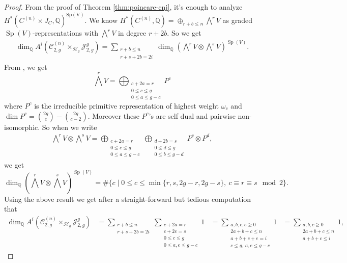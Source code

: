 \documentclass[11pt]{amsart}
\theoremstyle{definition}
\newcommand{\jac}{\mathcal{J}}
\newcommand{\h}{\mathcal{H}}
\newcommand{\mC}{\mathcal{C}}
\begin{document}
\begin{proof}
From the proof of Theorem \ref{thm:poincare-cnj}, it's enough to analyze $H^* (C^{(n)}\times J_C,\mathbb Q)^{\operatorname{Sp(V)}}$. We know $H^* (C^{(n)},\mathbb Q) = \oplus_{r+b \leq n}\bigwedge ^r V$ as graded $\operatorname{Sp}(V)$-representations with $\bigwedge^r V$ in degree $r+2b$. So we get\begin{equation*}
    \begin{aligned}
        \dim_{\mathbb Q} A^i(\mC_{2,g}^{(n)}\times_{\h_g}\jac^g_{2,g}) =\sum_{\substack{r+b\leq n \\ r+s+2b=2i}} \dim_{\mathbb Q} \left (\bigwedge^r V\otimes \bigwedge^{s} V \right )^{\operatorname{Sp}(V)}.
    \end{aligned}
\end{equation*}From \cite[Theorem 5.5.15, Corollary 5.5.16]{MR2522486}, we get \begin{equation*}
    \bigwedge^r V = \bigoplus_{\substack{ c+2a=r \\ 0\leq c\leq g \\ 0\leq a\leq g-c}} P^c
\end{equation*}where $P^c$ is the irreducible primitive representation of highest weight $\omega_c$ and $\dim P^c = \binom{2g}{c} -\binom{2g}{c-2}$. Moreover these $P^c$'s are self dual and pairwise non-isomorphic. So when we write \begin{equation*}
    \begin{aligned}
         \bigwedge^r V  \otimes  \bigwedge^{s} V =   \bigoplus_{\substack{ c+2a=r \\ 0\leq c\leq g \\ 0\leq a\leq g-c}} \bigoplus_{\substack{d+2b=s \\ 0\leq d\leq g \\ 0\leq b\leq g-d}} P^c \otimes P^{d},
    \end{aligned}
\end{equation*}we get \begin{equation*}
    \dim_{\mathbb Q} \left (\bigwedge^r V  \otimes  \bigwedge^{s} V \right ) ^{\operatorname{Sp}(V)} = \# \{c \mid  0\leq c\leq \min\{ r,s,2g-r,2g-s \}, \ c\equiv r\equiv s \mod 2\}.
\end{equation*}
Using the above result we get after a straight-forward but tedious computation that \begin{equation*}
    \begin{aligned}
 \dim_{\mathbb Q} A^i(\mC_{2,g}^{(n)}\times_{\h_g}\jac^g_{2,g})  & = \sum_{\substack{r+b \leq n \\ r+s+2b=2i} } \sum_{\substack{c+2a=r \\ c+2e=s \\ 0 \leq c\leq g\\ 0\leq a,e\leq g-c}} 1 &= \sum_{\substack{a,b,c,e\geq 0 \\ 2a+b+c\leq n \\ a+b+c+e=i \\ c\leq g,  \ a,e \leq g-c}}1 &= \sum_{\substack{a,b,c\geq 0 \\ 2a+b+c\leq n \\ a+b+c\leq i }}1   ,

\end{aligned}
\end{equation*}
\end{proof}
\end{document}
